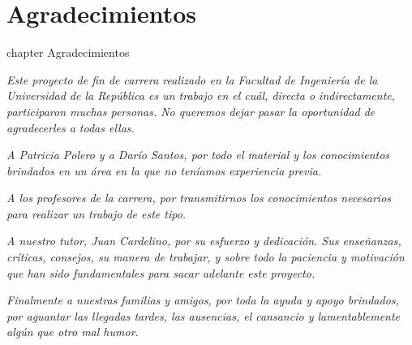 \chapter*{Agradecimientos}
 {chapter} {Agradecimientos}%


\textit{Este proyecto de fin de carrera realizado en la Facultad de Ingeniería de la Universidad de la República es un trabajo en el cuál, directa o indirectamente, participaron muchas personas. No queremos dejar pasar la oportunidad de agradecerles a todas ellas.}

\vspace{3 mm}

\textit{A Patricia Polero y a Darío Santos, por todo el material y los conocimientos brindados en un área en la que no teníamos experiencia previa.}

\vspace{3 mm}

\textit{A los profesores de la carrera, por transmitirnos los conocimientos necesarios para realizar un trabajo de este tipo.}

\vspace{3 mm}

\textit{A nuestro tutor, Juan Cardelino, por su esfuerzo y dedicación. Sus enseñanzas, críticas, consejos, su manera de trabajar, y sobre todo la paciencia y motivación que han sido fundamentales para sacar adelante este proyecto.}

\vspace{3 mm}

\textit{Finalmente a nuestras familias y amigos, por toda la ayuda y apoyo brindados, por aguantar las llegadas tardes, las ausencias, el cansancio y lamentablemente algún que otro mal humor.  }